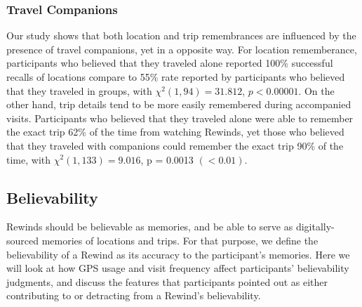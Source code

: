 \documentclass{sigchi}
\begin{document}
\subsubsection{Travel Companions}
Our study shows that both location and trip remembrances are influenced by the presence of travel companions, yet in a opposite way. For location rememberance, participants who believed that they traveled alone reported 100\% successful recalls of locations compare to 55\% rate reported by participants who believed that they traveled in groups, with $\chi^2(1,94) = 31.812$, $p < 0.00001$. On the other hand, trip details tend to be more easily remembered during accompanied visits. Participants who believed that they traveled alone were able to remember the exact trip 62\% of the time from watching Rewinds, yet those who believed that they traveled with companions could remember the exact trip 90\% of the time, with $\chi^2(1,133) = 9.016$, p = 0.0013 $(< 0.01)$.




\subsection{Believability}
Rewinds should be believable as memories, and be able to serve as digitally-sourced memories of locations and trips. For that purpose, we define the believability of a Rewind as its accuracy to the participant's memories. Here we will look at how GPS usage and visit frequency affect participants' believability judgments, and discuss the features that participants pointed out as either contributing to or detracting from a Rewind's believability.
\end{document}
